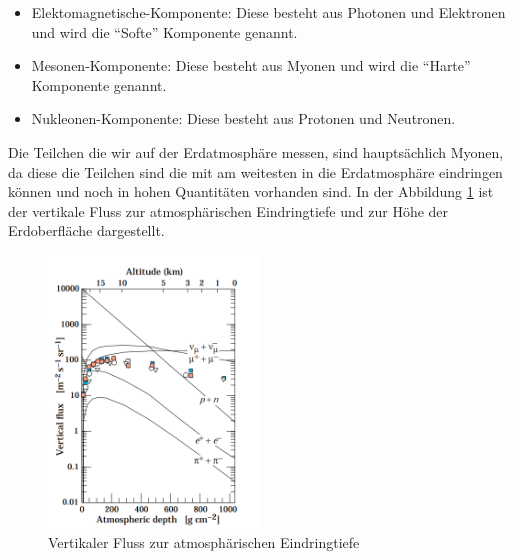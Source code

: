 \documentclass{article}
\begin{document}
\begin{itemize}
    \item Elektomagnetische-Komponente: Diese besteht aus Photonen und Elektronen und wird die \enquote{Softe} Komponente genannt.
    \item Mesonen-Komponente: Diese besteht aus Myonen und wird die \enquote{Harte} Komponente genannt.
    \item Nukleonen-Komponente: Diese besteht aus Protonen und Neutronen.
\end{itemize}
Die Teilchen die wir auf der Erdatmosphäre messen, sind hauptsächlich Myonen, da diese die Teilchen sind die mit am weitesten
in die Erdatmosphäre eindringen können und noch in hohen Quantitäten vorhanden sind.
In der Abbildung \ref{fig:Fluss} ist der vertikale Fluss zur atmosphärischen Eindringtiefe und zur Höhe der Erdoberfläche dargestellt.
\begin{figure}[H]
    \centering
    \includegraphics[width=0.5\textwidth]{figures/Fluss.png}
    \caption{Vertikaler Fluss zur atmosphärischen Eindringtiefe \cite{Naka}}
    \label{fig:Fluss}
\end{figure} 
\end{document}
